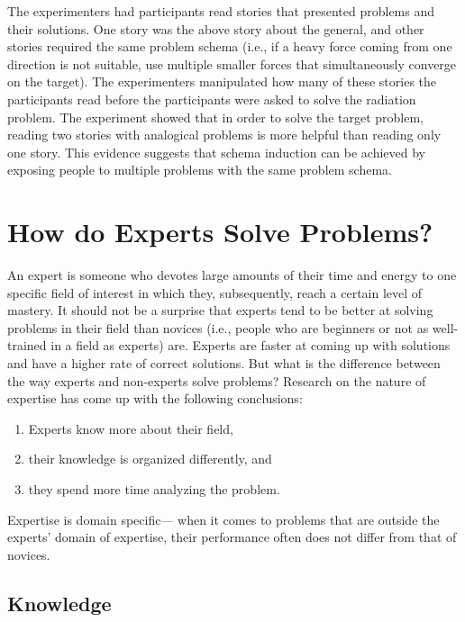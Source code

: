\documentclass[
]{krantz}
\begin{document}
The experimenters had participants read stories that presented problems and their solutions. One story was the above story about the general, and other stories required the same problem schema (i.e., if a heavy force coming from one direction is not suitable, use multiple smaller forces that simultaneously converge on the target). The experimenters manipulated how many of these stories the participants read before the participants were asked to solve the radiation problem. The experiment showed that in order to solve the target problem, reading two stories with analogical problems is more helpful than reading only one story. This evidence suggests that schema induction can be achieved by exposing people to multiple problems with the same problem schema.

\hypertarget{how-do-experts-solve-problems}{%
\section{How do Experts Solve Problems?}\label{how-do-experts-solve-problems}}

An expert is someone who devotes large amounts of their time and energy to one specific field of interest in which they, subsequently, reach a certain level of mastery. It should not be a surprise that experts tend to be better at solving problems in their field than novices (i.e., people who are beginners or not as well-trained in a field as experts) are. Experts are faster at coming up with solutions and have a higher rate of correct solutions. But what is the difference between the way experts and non-experts solve problems? Research on the nature of expertise has come up with the following conclusions:

\begin{enumerate}
\def\labelenumi{\arabic{enumi}.}
\item
  Experts know more about their field,
\item
  their knowledge is organized differently, and
\item
  they spend more time analyzing the problem.
\end{enumerate}

Expertise is domain specific--- when it comes to problems that are outside the experts' domain of expertise, their performance often does not differ from that of novices.

\hypertarget{knowledge-1}{%
\subsection*{Knowledge}\label{knowledge-1}}
\end{document}
